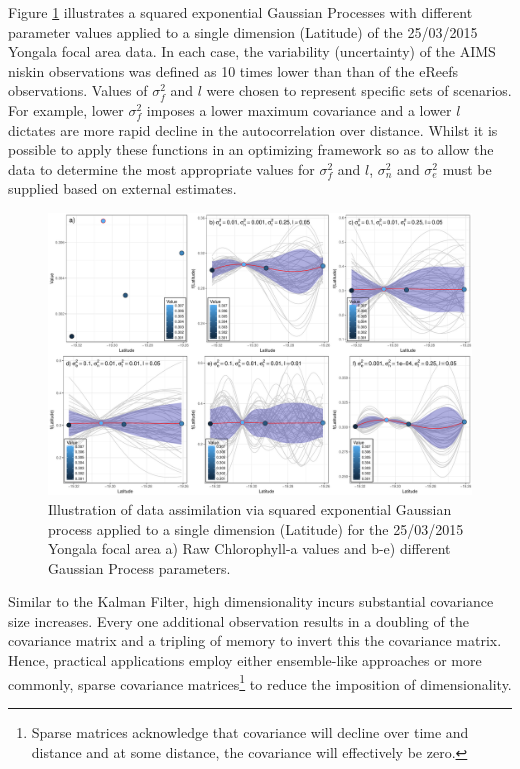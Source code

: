 Figure \ref{fig:focalArea_Spatial.Yongala_Measure_Method2.1.chl} illustrates a squared exponential Gaussian Processes with different parameter values applied to a single dimension (Latitude) of the
25/03/2015 Yongala focal area data.  In each case, the variability (uncertainty) of the AIMS niskin observations was defined as 10 times lower than than of the eReefs observations.
Values of $\sigma_f^2$ and $l$ were chosen to represent specific sets of scenarios.  For example, lower $\sigma_f^2$ imposes a lower maximum covariance and a lower $l$ dictates are
more rapid decline in the autocorrelation over distance.  Whilst it is possible to apply these functions in an optimizing framework so as to allow the data to determine
the most appropriate values for $\sigma_f^2$ and $l$, $\sigma_n^2$ and $\sigma_e^2$ must be supplied based on external estimates.   

\begin{figure}[!hptb]
  \includegraphics[width=\textwidth]{figures/FocalAreas/focalArea_Spatial.Yongala_Measure.chl_Method2.1.pdf}
  \caption[Illustration of Gaussian Process multi source aggregation for the Yongala focal area]{Illustration of data assimilation via squared exponential Gaussian process applied to a single dimension (Latitude) for the 25/03/2015 Yongala focal area a) Raw Chlorophyll-a values and b-e) different Gaussian Process parameters.}\label{fig:focalArea_Spatial.Yongala_Measure_Method2.1.chl}
\end{figure}
  
Similar to the Kalman Filter, high dimensionality incurs substantial covariance size increases.
Every one additional observation results in a doubling of the covariance matrix and a tripling of
memory to invert this the covariance matrix.  Hence, practical applications employ either ensemble-like approaches
or more commonly, sparse covariance matrices\footnote{Sparse matrices acknowledge that covariance will decline over time and distance and at some distance, the covariance will effectively be zero.} to reduce the imposition of dimensionality.

